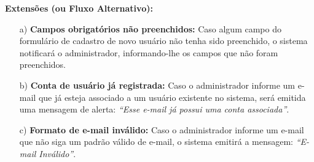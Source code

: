 \begin{mdframed}[nobreak=false]
\begin{flushleft}
		\textbf{Extensões (ou Fluxo Alternativo):}
		\begin{itemize}
			\item[a)] \textbf{Campos obrigatórios não preenchidos:} Caso algum campo do formulário de cadastro de novo usuário não tenha sido preenchido, o sistema notificará o administrador, informando-lhe os campos que não foram preenchidos.
			\item[b)] \textbf{Conta de usuário já registrada:} Caso o administrador informe um e-mail que já esteja associado a um usuário existente no sistema, será emitida uma mensagem de alerta: \textit{``Esse e-mail já possui uma conta associada''}.
			\item[c)] \textbf{Formato de e-mail inválido:} Caso o administrador informe um e-mail que não siga um padrão válido de e-mail, o sistema emitirá a mensagem: \textit{``E-mail Inválido''}.
		\end{itemize}
		\end{flushleft}
	\end{mdframed}


